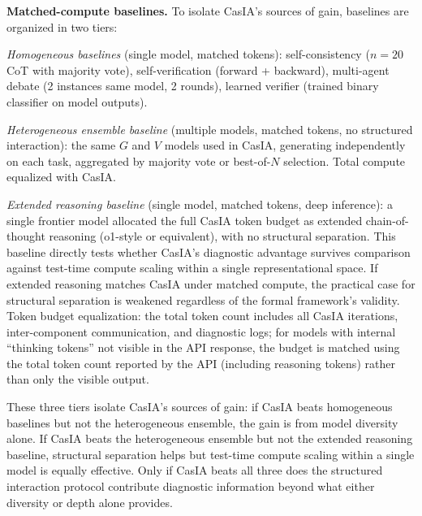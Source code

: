 \documentclass[11pt,a4paper]{article}
\theoremstyle{definition}
\begin{document}
\textbf{Matched-compute baselines.} To isolate CasIA's sources of gain, baselines are organized in two tiers:

\emph{Homogeneous baselines} (single model, matched tokens): self-consistency ($n=20$ CoT with majority vote), self-verification (forward + backward), multi-agent debate (2 instances same model, 2 rounds), learned verifier (trained binary classifier on model outputs).

\emph{Heterogeneous ensemble baseline} (multiple models, matched tokens, no structured interaction): the same $G$ and $V$ models used in CasIA, generating independently on each task, aggregated by majority vote or best-of-$N$ selection. Total compute equalized with CasIA.

\emph{Extended reasoning baseline} (single model, matched tokens, deep inference): a single frontier model allocated the full CasIA token budget as extended chain-of-thought reasoning (o1-style or equivalent), with no structural separation. This baseline directly tests whether CasIA's diagnostic advantage survives comparison against test-time compute scaling within a single representational space. If extended reasoning matches CasIA under matched compute, the practical case for structural separation is weakened regardless of the formal framework's validity. Token budget equalization: the total token count includes all CasIA iterations, inter-component communication, and diagnostic logs; for models with internal ``thinking tokens'' not visible in the API response, the budget is matched using the total token count reported by the API (including reasoning tokens) rather than only the visible output.

These three tiers isolate CasIA's sources of gain: if CasIA beats homogeneous baselines but not the heterogeneous ensemble, the gain is from model diversity alone. If CasIA beats the heterogeneous ensemble but not the extended reasoning baseline, structural separation helps but test-time compute scaling within a single model is equally effective. Only if CasIA beats all three does the structured interaction protocol contribute diagnostic information beyond what either diversity or depth alone provides.
\end{document}
